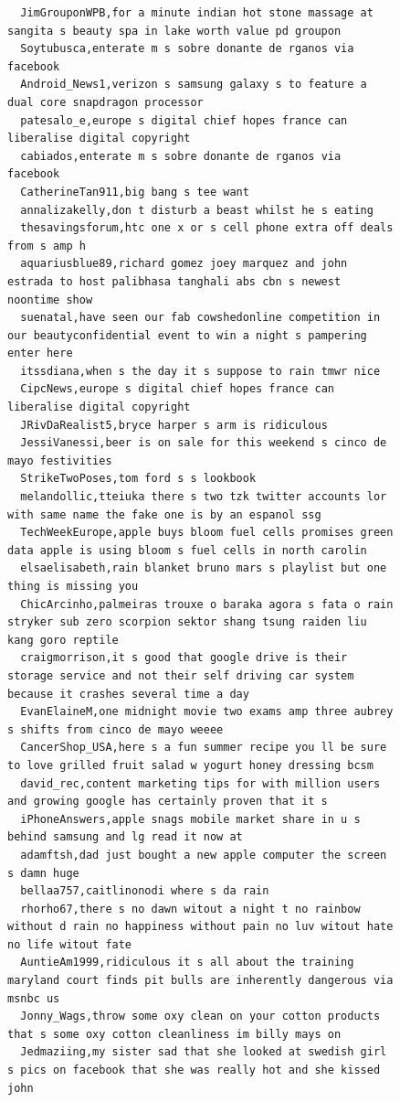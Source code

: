\begin{figure}[htpb]
\begin{verbatim}
  JimGrouponWPB,for a minute indian hot stone massage at sangita s beauty spa in lake worth value pd groupon
  Soytubusca,enterate m s sobre donante de rganos via facebook
  Android_News1,verizon s samsung galaxy s to feature a dual core snapdragon processor
  patesalo_e,europe s digital chief hopes france can liberalise digital copyright
  cabiados,enterate m s sobre donante de rganos via facebook
  CatherineTan911,big bang s tee want
  annalizakelly,don t disturb a beast whilst he s eating
  thesavingsforum,htc one x or s cell phone extra off deals from s amp h
  aquariusblue89,richard gomez joey marquez and john estrada to host palibhasa tanghali abs cbn s newest noontime show
  suenatal,have seen our fab cowshedonline competition in our beautyconfidential event to win a night s pampering enter here
  itssdiana,when s the day it s suppose to rain tmwr nice
  CipcNews,europe s digital chief hopes france can liberalise digital copyright
  JRivDaRealist5,bryce harper s arm is ridiculous
  JessiVanessi,beer is on sale for this weekend s cinco de mayo festivities
  StrikeTwoPoses,tom ford s s lookbook
  melandollic,tteiuka there s two tzk twitter accounts lor with same name the fake one is by an espanol ssg
  TechWeekEurope,apple buys bloom fuel cells promises green data apple is using bloom s fuel cells in north carolin
  elsaelisabeth,rain blanket bruno mars s playlist but one thing is missing you
  ChicArcinho,palmeiras trouxe o baraka agora s fata o rain stryker sub zero scorpion sektor shang tsung raiden liu kang goro reptile
  craigmorrison,it s good that google drive is their storage service and not their self driving car system because it crashes several time a day
  EvanElaineM,one midnight movie two exams amp three aubrey s shifts from cinco de mayo weeee
  CancerShop_USA,here s a fun summer recipe you ll be sure to love grilled fruit salad w yogurt honey dressing bcsm
  david_rec,content marketing tips for with million users and growing google has certainly proven that it s
  iPhoneAnswers,apple snags mobile market share in u s behind samsung and lg read it now at
  adamftsh,dad just bought a new apple computer the screen s damn huge
  bellaa757,caitlinonodi where s da rain
  rhorho67,there s no dawn witout a night t no rainbow without d rain no happiness without pain no luv witout hate no life witout fate
  AuntieAm1999,ridiculous it s all about the training maryland court finds pit bulls are inherently dangerous via msnbc us
  Jonny_Wags,throw some oxy clean on your cotton products that s some oxy cotton cleanliness im billy mays on
  Jedmaziing,my sister sad that she looked at swedish girl s pics on facebook that she was really hot and she kissed john

\end{verbatim}
\end{figure}
